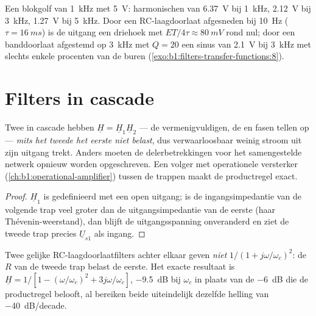 \begin{example}[Getallen]\label{ex:b1:filters-transfer-functions:numbers}
Een blokgolf van \qty{1}{kHz} met  \qty{5}{V}: harmonischen van
\qty{6.37}{V} bij \qty{1}{kHz}, \qty{2.12}{V} bij \qty{3}{kHz},
\qty{1.27}{V} bij \qty{5}{kHz}. Door een RC-laagdoorlaat afgesneden bij
\qty{10}{Hz} ($\tau = \qty{16}{ms}$) is de uitgang een driehoek met
 $ET/4\tau \approx \qty{80}{mV}$ rond nul; door een
banddoorlaat afgestemd op \qty{3}{kHz} met $Q = 20$ een sinus van \qty{2.1}{V}
bij \qty{3}{kHz} met slechts enkele procenten van de buren
(\cref{exo:b1:filters-transfer-functions:8}).
\end{example}

\section{Filters in cascade}

\begin{proposition}\label{prop:b1:filters-transfer-functions:cascade}
Twee  in cascade hebben $\underline H = \underline H_1\underline H_2$
--- de  vermenigvuldigen, de  en fasen tellen op --- \emph{mits het
tweede het eerste niet belast}, dus verwaarloosbaar weinig stroom uit zijn
uitgang trekt. Anders moeten de delerbetrekkingen voor het samengestelde
netwerk opnieuw worden opgeschreven. Een volger met operationele versterker
(\cref{ch:b1:operational-amplifier}) tussen de trappen maakt de productregel
exact.
\end{proposition}

\begin{proof}
$\underline H_1$ is gedefinieerd met een open uitgang; is de ingangsimpedantie
van de volgende trap veel groter dan de uitgangsimpedantie van de eerste
(haar Thévenin-weerstand), dan blijft de uitgangsspanning onveranderd en ziet de
tweede trap precies $\underline U_{s1}$ als ingang.
\end{proof}

\begin{example}\label{ex:b1:filters-transfer-functions:tworc}
Twee gelijke RC-laagdoorlaatfilters achter elkaar geven \emph{niet}
$1/(1 + j\omega/\omega_c)^2$: de $R$ van de tweede trap belast de eerste.
Het exacte resultaat is $\underline H = 1/[1 - (\omega/\omega_c)^2 +
3j\omega/\omega_c]$, \qty{-9.5}{dB} bij $\omega_c$ in plaats van de
\qty{-6}{dB} die de productregel belooft, al bereiken beide uiteindelijk dezelfde
helling van \qty{-40}{dB/decade}.
\end{example}

